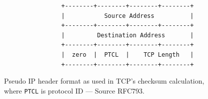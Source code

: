 \documentclass[pdftex,12pt,a4paper]{article}
\begin{document}
                \begin{figure}[tbh]
                    \centering
                        \small\begin{verbatim}                +--------+--------+--------+--------+
                |           Source Address          |
                +--------+--------+--------+--------+
                |         Destination Address       |
                +--------+--------+--------+--------+
                |  zero  |  PTCL  |    TCP Length   |
                +--------+--------+--------+--------+\end{verbatim}\normalsize
                    \vspace{-15pt}
                    \caption{Pseudo IP header format as used in TCP's checksum
                    calculation, where \texttt{PTCL} is protocol ID --- Source RFC793.}
                    \label{fig:tcpsip}
                \end{figure}
\end{document}
